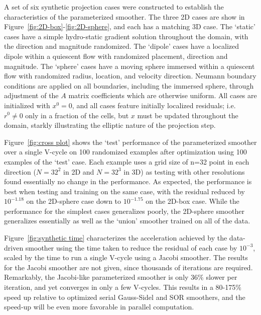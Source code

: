 \documentclass[review]{elsarticle}
\begin{document}
A set of six synthetic projection cases were constructed to establish the characteristics of the parameterized smoother. The three 2D cases are show in Figure~\ref{fig:2D-box}-\ref{fig:2D-sphere}, and each has a matching 3D case. The `static' cases have a simple hydro-static gradient solution throughout the domain, with the direction and magnitude randomized. The `dipole' cases have a localized dipole within a quiescent flow with randomized placement, direction and magnitude. The `sphere' cases have a moving sphere immersed within a quiescent flow with randomized radius, location, and velocity direction. Neumann boundary conditions are applied on all boundaries, including the immersed sphere, through adjustment of the $A$ matrix coefficients which are otherwise uniform. All cases are initialized with $x^0=0$, and all cases feature initially localized residuals; i.e. $r^0\ne0$ only in a fraction of the cells, but $x$ must be updated throughout the domain, starkly illustrating the elliptic nature of the projection step. 

Figure~\ref{fig:cross plot} shows the `test' performance of the parameterized smoother over a single V-cycle on 100 randomized examples after optimization using 100 examples of the `test' case. Each example uses a grid size of n=32 point in each direction ($N=32^2$ in 2D and $N=32^3$ in 3D) as testing with other resolutions found essentially no change in the performance. As expected, the performance is best when testing and training on the same case, with the residual reduced by $10^{-1.18}$ on the 2D-sphere case down to $10^{-1.75}$ on the 2D-box case. While the performance for the simplest cases generalizes poorly, the 2D-sphere smoother generalizes essentially as well as the `union' smoother trained on all of the data. 

Figure~\ref{fig:synthetic time} characterizes the acceleration achieved by the data-driven smoother using the time taken to reduce the residual of each case by $10^{-3}$, scaled by the time to run a single V-cycle using a Jacobi smoother. The results for the Jacobi smoother are not given, since thousands of iterations are required. Remarkably, the Jacobi-like parameterized smoother is only 36\% slower per iteration, and yet converges in only a few V-cycles. This results in a 80-175\% speed up relative to optimized serial Gauss-Sidel and SOR smoothers, and the speed-up will be even more favorable in parallel computation.
\end{document}
